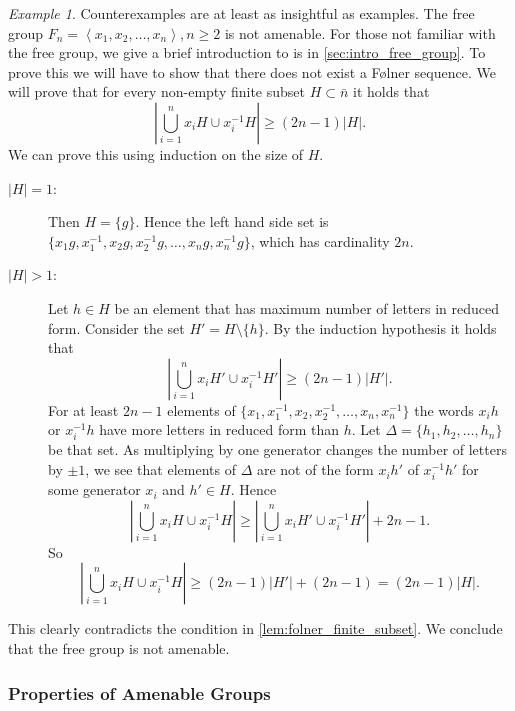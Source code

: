 \documentclass[titlepage, a4paper]{article}
\newcommand{\card}[1]{\left| #1 \right|}
\theoremstyle{remark}
\newtheorem{example}[theorem]{Example}
\begin{document}
\begin{example}
	Counterexamples are at least as insightful as examples. 
	The free group $F_n = \left<x_1, x_2, \ldots, x_n \right>, n \ge 2$ is not amenable. %
	For those not familiar with the free group, we give a brief introduction to is in \cref{sec:intro_free_group}.
	To prove this we will have to show that there does not exist a Følner sequence.
	We will prove that for every non-empty finite subset $H \subset \bar{n}$ it holds that \[
		\card{\bigcup_{i = 1}^{n} x_iH \cup x_i^{-1}H} \ge (2n-1) \card{H}
	.\] 
	We can prove this using induction on the size of $H$. 
	\begin{description}
		\item[$\card{H} = 1$:] Then $H = \{g\}$. 
			Hence the left hand side set is $\{x_1g, x_1^{-1}, x_2g, x_2^{-1}g, \ldots, x_ng, x_n^{-1}g\} $, which has cardinality $2n$. 
		\item[$\card{H} > 1$:] 
			Let $ h \in H$ be an element that has maximum number of letters in reduced form.
			Consider the set $H' = H\setminus \{h\} $. 
			By the induction hypothesis it holds that %
			\[	
				\card{\bigcup_{i = 1}^{n} x_iH' \cup x_i^{-1}H'} \ge (2n-1) \card{H'}
			.\] 
			For at least $2n-1$ elements of $\{x_1,x_1^{-1},x_2,x_2^{-1},\ldots, x_n, x_n^{-1}\} $ the words $x_ih$ or  $x_i^{-1}h$ have more letters in reduced form than $h$. Let $\Delta = \{ h_1, h_2, \ldots, h_n\} $ be that set.  
			As multiplying by one generator changes the number of letters by $\pm 1$, we see that elements of $\Delta$ are not of the form $x_ih'$ of $x_i^{-1}h'$ for some generator $x_i$ and $h' \in H$. 
			Hence \[
				\card{\bigcup_{i = 1}^{n} x_iH \cup x_i^{-1}H}  \ge \card{\bigcup_{i = 1}^{n} x_iH' \cup x_i^{-1}H'} + 2n-1
 			.\]
			So \[
				\card{\bigcup_{i = 1}^{n} x_iH \cup x_i^{-1}H} \ge (2n-1)\card{H'} + (2n-1) = (2n-1 ) \card{H}
			.\]
	\end{description}
	This clearly contradicts the condition in \cref{lem:folner_finite_subset}. 
	We conclude that the free group is not amenable.  
\end{example}

\subsubsection{Properties of Amenable Groups}
\end{document}
